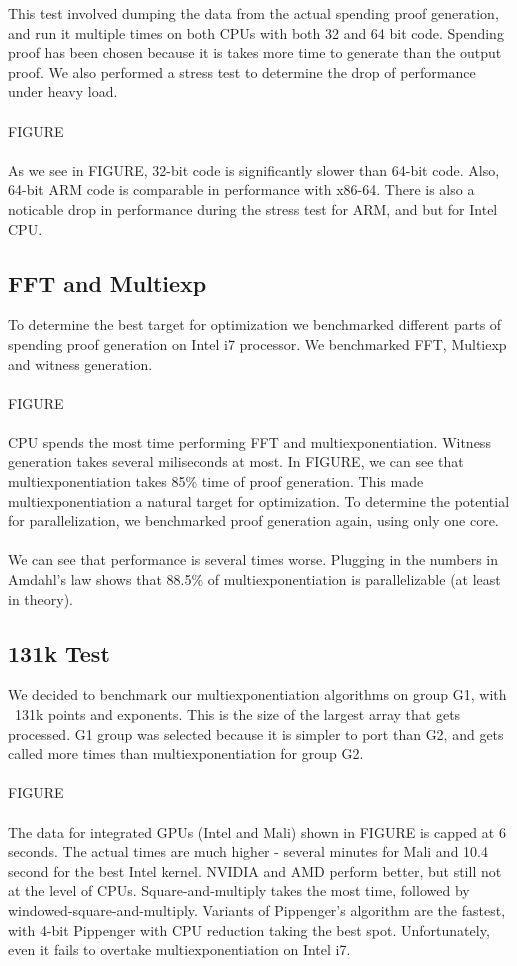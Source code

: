 This test involved dumping the data from the actual spending proof generation, and run it multiple times on both CPUs with both 32 and 64 bit code. Spending proof has been chosen because it is takes more time to generate than the output proof. We also performed a stress test to determine the drop of performance under heavy load.\\
\\
FIGURE\\
\\
As we see in FIGURE, 32-bit code is significantly slower than 64-bit code. Also, 64-bit ARM code is comparable in performance with x86-64. There is also a noticable drop in performance during the stress test for ARM, and but for Intel CPU.

\subsection{FFT and Multiexp}

To determine the best target for optimization we benchmarked different parts of spending proof generation on Intel i7 processor. We benchmarked FFT, Multiexp and witness generation.\\
\\
FIGURE\\
\\
CPU spends the most time performing FFT and multiexponentiation. Witness generation takes several miliseconds at most. In FIGURE, we can see that multiexponentiation takes 85\% time of proof generation. This made multiexponentiation a natural target for optimization. To determine the potential for parallelization, we benchmarked proof generation again, using only one core.\\
\\
We can see that performance is several times worse. Plugging in the numbers in Amdahl's law shows that 88.5\% of multiexponentiation is parallelizable (at least in theory).

\subsection{131k Test}

We decided to benchmark our multiexponentiation algorithms on group G1, with ~131k points and exponents. This is the size of the largest array that gets processed. G1 group was selected because it is simpler to port than G2, and gets called more times than multiexponentiation for group G2.\\
\\
FIGURE\\
\\
The data for integrated GPUs (Intel and Mali) shown in FIGURE is capped at 6 seconds. The actual times are much higher - several minutes for Mali and 10.4 second for the best Intel kernel. NVIDIA and AMD perform better, but still not at the level of CPUs. Square-and-multiply takes the most time, followed by windowed-square-and-multiply. Variants of Pippenger's algorithm are the fastest, with 4-bit Pippenger with CPU reduction taking the best spot. Unfortunately, even it fails to overtake multiexponentiation on Intel i7.

